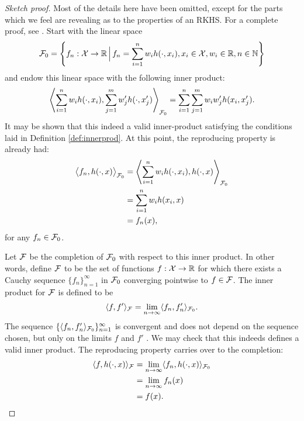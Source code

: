 \begin{proof}[Sketch proof]
  Most of the details here have been omitted, except for the parts which we feel are revealing as to the properties of an RKHS.
  For a complete proof, see \citet{berlinet2011reproducing}. 
  Start with the linear space
  \[
    {\mathcal F}_0 = \left\{ f_n:{\mathcal X}\to\mathbb{R} \, \Big| \, f_n = \sum_{i=1}^n w_i h(\cdot,x_i), x_i\in{\mathcal X}, w_i\in\mathbb{R}, n\in\mathbb{N} \right\}
  \]
  and endow this linear space with the following inner product:
  \[
    \left\langle \sum_{i=1}^n w_i h(\cdot,x_i), \sum_{j=1}^m w_j' h(\cdot,x_j') \right\rangle_{{\mathcal F}_0} = \sum_{i=1}^n\sum_{j=1}^m w_i w_j' h(x_i,x_j').
  \]
  It may be shown that this indeed a valid inner-product satisfying the conditions laid in Definition \ref{def:innerprod}.
  At this point, the reproducing property is already had:
  \begin{align*}
    \big\langle f_n, h(\cdot,x) \big\rangle_{{\mathcal F}_0} 
    &= \left\langle \sum_{i=1}^n w_i h(\cdot,x_i), h(\cdot,x) \right\rangle_{{\mathcal F}_0} \\
    &= \sum_{i=1}^n w_i h(x_i,x) \\
    &= f_n(x),
  \end{align*}
  for any $f_n\in{\mathcal F}_0$.
  
  Let ${\mathcal F}$ be the completion of ${\mathcal F}_0$ with respect to this inner product.
  In other words, define ${\mathcal F}$ to be the set of functions $f:{\mathcal X}\to\mathbb{R}$ for which there exists a Cauchy sequence $\{f_n\}_{n=1}^\infty$ in ${\mathcal F}_0$ converging pointwise to $f \in {\mathcal F}$.
  The inner product for ${\mathcal F}$ is defined to be
  \[
    \langle f,f'\rangle_{\mathcal F} = \lim_{n\to\infty} \langle f_n,f_n'\rangle_{{\mathcal F}_0}.
  \]
  The sequence $\{ \langle f_n,f_n'\rangle_{{\mathcal F}_0} \}_{n=1}^\infty$ is convergent and does not depend on the sequence chosen, but only on the limits $f$ and $f'$ \citep[Lemma 5]{berlinet2011reproducing}.
  We may check that this indeeds defines a valid inner product.
  The reproducing property carries over to the completion:
  \begin{align*}
    \langle f,h(\cdot,x)\rangle_{\mathcal F} 
    &= \lim_{n\to\infty} \langle f_n,h(\cdot,x)\rangle_{{\mathcal F}_0} \\
    &= \lim_{n\to\infty} f_n(x) \\
    &= f(x).
  \end{align*}
  

\end{proof}
